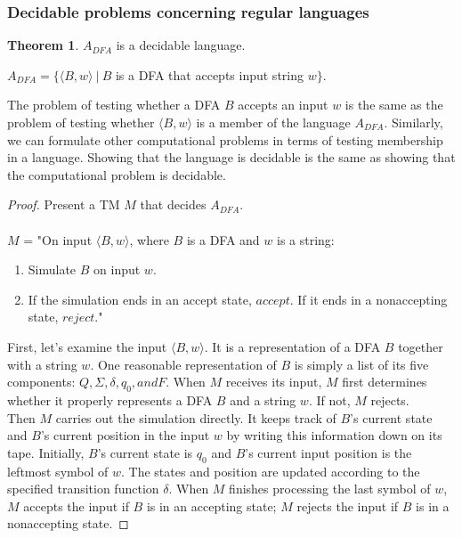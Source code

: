 \documentclass[11pt]{article}
\theoremstyle{definition}
\newtheorem{thm}{Theorem}[section]
\begin{document}
\subsubsection{Decidable problems concerning regular languages}
\begin{thm}
    $A_{DFA}$ is a decidable language.
    \begin{center}
        $A_{DFA} = \{\langle B,w\rangle\ |\ B$ is a DFA that accepts input string $w\}$.
    \end{center}
    The problem of testing whether a DFA $B$ accepts an input $w$ is the same as the problem of testing whether $\langle B, w\rangle$ is a member of the language $A_{DFA}$. Similarly, we can formulate other computational problems in terms of testing membership in a language. Showing that the language is decidable is the same as showing that the computational problem is decidable.
\end{thm}
\begin{proof}
    Present a TM $M$ that decides $A_{DFA}$.\\\\
    $M$ = "On input $\langle B, w\rangle$, where $B$ is a DFA and $w$ is a string:
    \begin{enumerate}
        \item Simulate $B$ on input $w$.
        \item If the simulation ends in an accept state, $accept$. If it ends in a nonaccepting state, $reject$."
    \end{enumerate}
First, let's examine the input $\langle B, w\rangle$. It is a representation of a DFA $B$ together with a string $w$. One reasonable representation of $B$ is simply a list of its five components: $Q, \Sigma, \delta, q_0, and F$. When $M$ receives its input, $M$ first determines whether it properly represents a DFA $B$ and a string $w$. If not, $M$ rejects.\\
Then $M$ carries out the simulation directly. It keeps track of $B$'s current state and $B$'s current position in the input $w$ by writing this information down on its tape. Initially, $B$'s current state is $q_0$ and $B$'s current input position is the leftmost symbol of $w$. The states and position are updated according to the specified transition function $\delta$. When $M$ finishes processing the last symbol of $w$, $M$ accepts the input if $B$ is in an accepting state; $M$ rejects the input if $B$ is in a nonaccepting state.
\end{proof}
\end{document}
